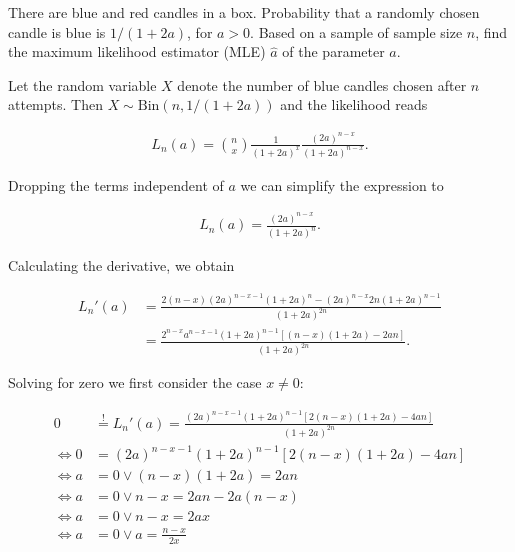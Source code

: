 
\begin{exercise}

There are blue and red candles in a box. Probability that a randomly chosen candle
is blue is $1/(1 + 2a)$, for $a > 0$. Based on a sample of sample size $n$, find
the maximum likelihood estimator (MLE) $\hat{a}$ of the parameter $a$.

\end{exercise}


\begin{solution}

Let the random variable $X$ denote the number of blue candles chosen after $n$ attempts.
Then $X \sim \text{Bin}(n, 1/(1 + 2a))$ and the likelihood reads

\begin{align*}
  L_n(a) = \binom{n}{x}\frac{1}{(1 + 2a)^x}\frac{(2a)^{n-x}}{(1 + 2a)^{n-x}}.
\end{align*}

Dropping the terms independent of $a$ we can simplify the expression to

\begin{align*}
  L_n(a) = \frac{(2a)^{n-x}}{(1 + 2a)^{n}}.
\end{align*}

Calculating the derivative, we obtain

\begin{align*}
  L_n'(a) &= \frac{2(n-x)(2a)^{n-x-1}(1+2a)^n - (2a)^{n-x}2n(1+2a)^{n-1}}{(1+2a)^{2n}} \\
  &= \frac{2^{n-x}a^{n-x-1}(1+2a)^{n-1}[(n-x)(1+2a) - 2an]}{(1+2a)^{2n}}.
\end{align*}

Solving for zero we first consider the case $x \neq 0$:

\begin{align*}
  0 &\stackrel{!}{=} L_n'(a) = \frac{(2a)^{n-x-1}(1+2a)^{n-1}[2(n-x)(1+2a) - 4an]}{(1+2a)^{2n}} \\
  \iff 0 &= (2a)^{n-x-1}(1+2a)^{n-1}[2(n-x)(1+2a) - 4an] \\
  \iff a &= 0 \lor (n-x)(1+2a) = 2an \\
  \iff a &= 0 \lor n-x = 2an - 2a(n - x)\\
  \iff a &= 0 \lor n - x = 2ax \\
  \iff a &= 0 \lor a = \frac{n - x}{2x} \\
\end{align*}


\end{solution}
